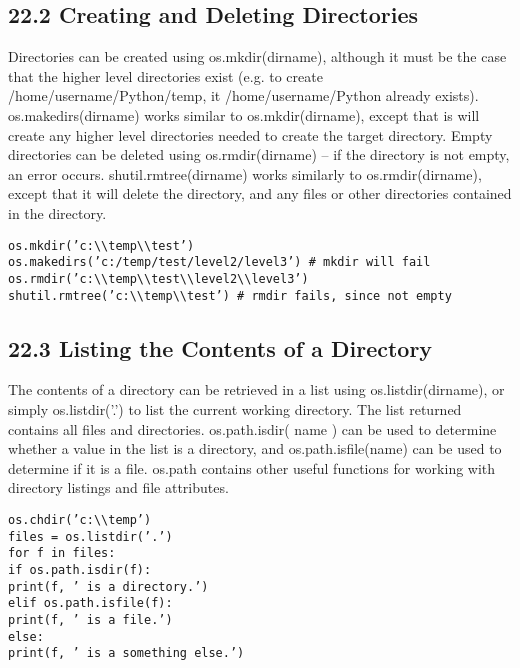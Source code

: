\documentclass[KSmain.tex]{subfiles}
\begin{document}
\subsection{22.2 Creating and Deleting Directories}
Directories can be created using os.mkdir(dirname), although it must be the case that the higher level directories
exist (e.g. to create /home/username/Python/temp, it /home/username/Python already exists). os.makedirs(dirname)
works similar to os.mkdir(dirname), except that is will create any higher level directories needed to create
the target directory.
Empty directories can be deleted using os.rmdir(dirname) – if the directory is not empty, an error
occurs. shutil.rmtree(dirname) works similarly to os.rmdir(dirname), except that it will delete the directory,
and any files or other directories contained in the directory.
\begin{framed}
\begin{verbatim}
os.mkdir(’c:\\temp\\test’)
os.makedirs(’c:/temp/test/level2/level3’) # mkdir will fail
os.rmdir(’c:\\temp\\test\\level2\\level3’)
shutil.rmtree(’c:\\temp\\test’) # rmdir fails, since not empty
\end{verbatim}
\end{framed}
\subsection{22.3 Listing the Contents of a Directory}
The contents of a directory can be retrieved in a list using os.listdir(dirname), or simply os.listdir(’.’)
to list the current working directory. The list returned contains all files and directories. os.path.isdir(
name ) can be used to determine whether a value in the list is a directory, and os.path.isfile(name)
can be used to determine if it is a file. os.path contains other useful functions for working with directory
listings and file attributes.
\begin{framed}
\begin{verbatim}
os.chdir(’c:\\temp’)
files = os.listdir(’.’)
for f in files:
if os.path.isdir(f):
print(f, ’ is a directory.’)
elif os.path.isfile(f):
print(f, ’ is a file.’)
else:
print(f, ’ is a something else.’)
\end{verbatim}
\end{framed}
\end{document}
